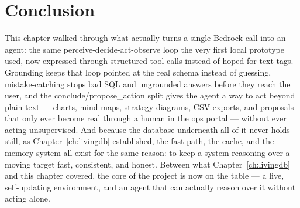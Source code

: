 \section*{Conclusion}

This chapter walked through what actually turns a single Bedrock call
into an agent: the same perceive-decide-act-observe loop the very
first local prototype used, now expressed through structured tool
calls instead of hoped-for text tags. Grounding keeps that loop
pointed at the real schema instead of guessing, mistake-catching
stops bad SQL and ungrounded answers before they reach the user, and
the conclude/propose\_action split gives the agent a way to act beyond
plain text --- charts, mind maps, strategy diagrams, CSV exports, and
proposals that only ever become real through a human in the ops
portal --- without ever acting unsupervised. And because the database
underneath all of it never holds still, as Chapter~\ref{ch:livingdb} established, the
fast path, the cache, and the memory system all exist for the same
reason: to keep a system reasoning over a moving target fast,
consistent, and honest. Between what Chapter~\ref{ch:livingdb} and this chapter
covered, the core of the project is now on the table --- a live,
self-updating environment, and an agent that can actually reason over
it without acting alone.
